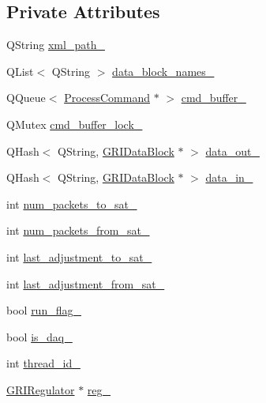 \subsection*{\-Private \-Attributes}
\begin{DoxyCompactItemize}
\item 
\-Q\-String \hyperlink{classGRIProcessThread_a2554bf45bd5097d3074c4ae7c50e9daa}{xml\-\_\-path\-\_\-}
\item 
\-Q\-List$<$ \-Q\-String $>$ \hyperlink{classGRIProcessThread_ad0fb6d68e75ba1c87d913edcd863ace2}{data\-\_\-block\-\_\-names\-\_\-}
\item 
\-Q\-Queue$<$ \hyperlink{structProcessCommand}{\-Process\-Command} $\ast$ $>$ \hyperlink{classGRIProcessThread_ac2f88f4a351a4c5ef86a7c797c7e548a}{cmd\-\_\-buffer\-\_\-}
\item 
\-Q\-Mutex \hyperlink{classGRIProcessThread_a827bcf8628fd76cc8a6d260c0b4623a2}{cmd\-\_\-buffer\-\_\-lock\-\_\-}
\item 
\-Q\-Hash$<$ \-Q\-String, \hyperlink{classGRIDataBlock}{\-G\-R\-I\-Data\-Block} $\ast$ $>$ \hyperlink{classGRIProcessThread_a33bf6fff182f03b00d43d3d3a66409ee}{data\-\_\-out\-\_\-}
\item 
\-Q\-Hash$<$ \-Q\-String, \hyperlink{classGRIDataBlock}{\-G\-R\-I\-Data\-Block} $\ast$ $>$ \hyperlink{classGRIProcessThread_aa89164841b50bd60d0da3ae9e3254f62}{data\-\_\-in\-\_\-}
\item 
int \hyperlink{classGRIProcessThread_af40bc18b79529b079c46ab55bfc806b2}{num\-\_\-packets\-\_\-to\-\_\-sat\-\_\-}
\item 
int \hyperlink{classGRIProcessThread_adcf581f4fc99468d4c81ce4033add63b}{num\-\_\-packets\-\_\-from\-\_\-sat\-\_\-}
\item 
int \hyperlink{classGRIProcessThread_a7085814bd5c193bf6f233e755bf06630}{last\-\_\-adjustment\-\_\-to\-\_\-sat\-\_\-}
\item 
int \hyperlink{classGRIProcessThread_a451c53d3a1912e358e9008f86fa490e2}{last\-\_\-adjustment\-\_\-from\-\_\-sat\-\_\-}
\item 
bool \hyperlink{classGRIProcessThread_a8fb2fe6170dd07f06cfe25963398afd0}{run\-\_\-flag\-\_\-}
\item 
bool \hyperlink{classGRIProcessThread_acea50dedd5b028dcc66ed86b807ca8b0}{is\-\_\-daq\-\_\-}
\item 
int \hyperlink{classGRIProcessThread_a35f82ee828412c8b75cdc24ba765f8ed}{thread\-\_\-id\-\_\-}
\item 
\hyperlink{classGRIRegulator}{\-G\-R\-I\-Regulator} $\ast$ \hyperlink{classGRIProcessThread_a6ee0190728642ea5242085b2949d2da2}{reg\-\_\-}
\end{DoxyCompactItemize}


